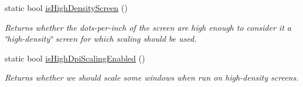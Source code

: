 \begin{DoxyCompactItemize}
static bool \mbox{\hyperlink{classsgl_1_1GWindow_a674ef3ad6e66d778e410e130cad47274}{is\+High\+Density\+Screen}} ()
\begin{DoxyCompactList}\small\item\em Returns whether the dots-\/per-\/inch of the screen are high enough to consider it a \char`\"{}high-\/density\char`\"{} screen for which scaling should be used. \end{DoxyCompactList}\item 
static bool \mbox{\hyperlink{classsgl_1_1GWindow_a040690336154a3f414001a16ffdb947e}{is\+High\+Dpi\+Scaling\+Enabled}} ()
\begin{DoxyCompactList}\small\item\em Returns whether we should scale some windows when run on high-\/density screens. \end{DoxyCompactList}\end{DoxyCompactItemize}
